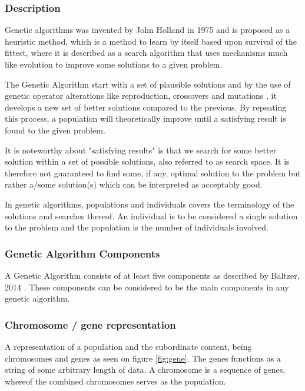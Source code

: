\subsubsection{Description}
Genetic algorithms was invented by John Holland in 1975 and is proposed as a heuristic method, which is a method to learn by itself based upon survival of the fittest, where it is described as a  search algorithm that uses mechanisms much like evolution to improve some solutions to a given problem. \cite[pp. 20]{Sivanandam2008}

The Genetic Algorithm start with a set of plausible solutions and by the use of genetic operator alterations like reproduction, crossovers and mutations \cite{Baltzer2014}, it develops a new set of better solutions compared to the previous. By repeating this process, a population will theoretically improve until a satisfying result is found to the given problem. \cite{BCS2013}

It is noteworthy about "satisfying results" is that we search for some better solution within a set of possible solutions, also referred to as search space. It is therefore not guaranteed to find some, if any, optimal solution to the problem but rather a/some solution(s) which can be interpreted as acceptably good. \cite[pp. 20/21]{Sivanandam2008}


In genetic algorithms, populations and individuals covers the terminology of the solutions and searches thereof. An individual is to be considered a single solution to the problem and the population is the number of individuals involved. \cite[pp. 39]{Sivanandam2008}



\subsubsection{Genetic Algorithm Components}

A Genetic Algorithm consists of at least five components as described by Baltzer, 2014 \cite{Baltzer2014}. These components can be considered to be the main components in any genetic algorithm.


\subsubsection*{Chromosome / gene representation}

A representation of a population and the subordinate content, being chromosomes and genes as seen on figure \ref{fig:gene}.
The genes functions as a string of some arbitrary length of data. A chromosome is a sequence of genes, whereof the combined chromosomes serves as the population. \cite[pp. 41]{Sivanandam2008}

